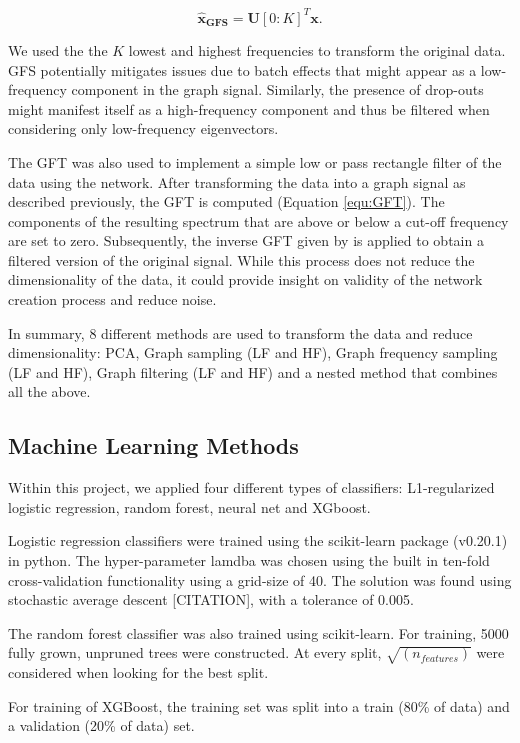 \documentclass[10pt,conference,compsocconf]{IEEEtran}
\begin{document}
\begin{equation}
\boldsymbol{\hat{x}_{GFS}} = \boldsymbol{U}[0:K]^T \boldsymbol{x}.
\end{equation} 
\par
We used the the $K$ lowest and highest frequencies to transform the original data. GFS potentially mitigates issues due to batch effects that might appear as a low-frequency component in the graph signal. Similarly, the presence of drop-outs might manifest itself as a high-frequency component and thus be filtered when considering only low-frequency eigenvectors.\\
\par
The GFT was also used to implement a simple low or pass rectangle filter of the data using the network. After transforming the data into a graph signal as described previously, the GFT is computed (Equation \ref{equ:GFT}). The components of the resulting spectrum that are above or below a cut-off frequency are set to zero. Subsequently, the inverse GFT given by is applied to obtain a filtered version of the original signal. While this process does not reduce the dimensionality of the data, it could provide insight on validity of the network creation process and reduce noise.
\par
In summary, 8 different methods are used to transform the data and reduce dimensionality: PCA, Graph sampling (LF and HF), Graph frequency sampling (LF and HF), Graph filtering (LF and HF) and a nested method that combines all the above.

\subsection{Machine Learning Methods}
Within this project, we applied four different types of classifiers: L1-regularized logistic regression, random forest, neural net and XGboost.
\par
Logistic regression classifiers were trained using the scikit-learn package (v0.20.1) in python. The hyper-parameter lamdba was chosen using the built in ten-fold cross-validation functionality using a grid-size of 40. The solution was found using stochastic average descent [CITATION], with a tolerance of 0.005. 
\par
The random forest classifier was also trained using scikit-learn. For training, 5000 fully grown, unpruned trees were constructed. At every split, $\sqrt{(n_{features})}$ were considered when looking for the best split.
\par
For training of XGBoost, the training set was split into a train (80\% of data) and a validation (20\% of data) set. 
\end{document}
